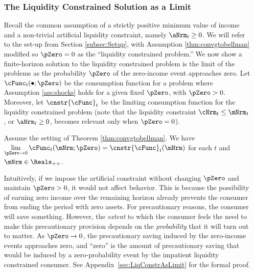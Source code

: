\documentclass[BufferStockTheory]{subfiles}
\begin{document}
\hypertarget{The-Liquidity-Constrained-Solution-as-a-Limit}{}
\subsubsection{The Liquidity Constrained Solution as a Limit}\label{subsubsec:deatonIsLimit}

Recall the common assumption \citep{deatonLiqConstr,aiyagari:ge, lsIncFluct, mstIncFluct} of a strictly positive minimum value of income and a non-trivial artificial liquidity constraint, namely $\aNrm_{t}\geq 0$.
We will refer to the set-up from Section \ref{subsec:Setup}, with Assumption \ref{thm:convgtobellman} modified so $\pZero=0$ as the ``liquidity constrained problem.'' We now show a finite-horizon solution to the liquidity constrained problem is the limit of the problems as the probability $\pZero$ of the zero-income event approaches zero.
Let $\cFunc_{t}(\bullet;\pZero)$ be the consumption function for a problem where Assumption \ref{ass:shocks} holds for a given fixed $\pZero$, with $\pZero>0$.
Moreover, let $\cnstr{\cFunc}_{t}$ be the limiting consumption function for the liquidity constrained problem (note that the liquidity constraint $\cNrm_{t}\leq \mNrm_{t}$, or $\aNrm_{t}\geq 0$, becomes relevant only when $\pZero= 0$).

\begin{proposition}\label{prop:deatonIsLimit}
Assume the setting of Theorem \ref{thm:convgtobellman}. We have $\lim\limits_{\pZero \rightarrow 0} \cFunc_{t}(\mNrm;\pZero)  = \cnstr{\cFunc}_{t}(\mNrm)$ for each $t$ and $\mNrm\in \Reals_{++}$. 
\end{proposition}

Intuitively, if we impose the artificial constraint without changing $\pZero$ and maintain $\pZero>0$, it would not affect behavior.
This is because the possibility of earning zero income over the remaining horizon already prevents the consumer from ending the period with zero assets.
For precautionary reasons, the consumer will save something.
However, the \textit{extent} to which the consumer feels the need to make this precautionary provision depends on the \textit{probability} that it will turn out to matter.
As  $\pZero \rightarrow 0$, the   precautionary saving induced by the zero-income events approaches zero, and ``zero'' is the amount of precautionary saving that would be induced by a zero-probability event by the impatient liquidity constrained consumer.
See Appendix~\ref{sec:LiqConstrAsLimit} for the formal proof.
\end{document}
